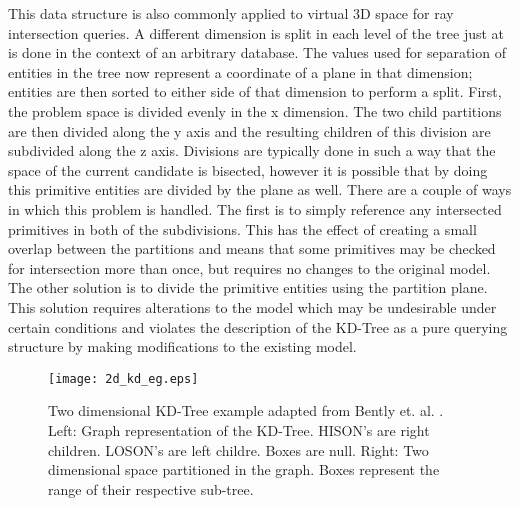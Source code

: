 This data structure is also commonly applied to virtual 3D space for ray
intersection queries. A different dimension is split in each level of the tree
just at is done in the context of an arbitrary database. The values used for
separation of entities in the tree now represent a coordinate of a plane in that
dimension; entities are then sorted to either side of that dimension to perform
a split. First, the problem space is divided evenly in the x dimension. The two
child partitions are then divided along the y axis and the resulting children of
this division are subdivided along the z axis. Divisions are typically done in
such a way that the space of the current candidate is bisected, however it is
possible that by doing this primitive entities are divided by the plane as
well. There are a couple of ways in which this problem is handled. The first is
to simply reference any intersected primitives in both of the subdivisions. This
has the effect of creating a small overlap between the partitions and means that
some primitives may be checked for intersection more than once, but requires no
changes to the original model. The other solution is to divide the primitive
entities using the partition plane.  This solution requires alterations to the
model which may be undesirable under certain conditions and violates the
description of the KD-Tree as a pure querying structure by making modifications
to the existing model.

\begin{figure}[H]

  \texttt{[image: 2d\_kd\_eg.eps]}
  \caption{Two dimensional KD-Tree example adapted from Bently
    et. al. \cite{Bentley_1975}. Left: Graph representation of the
    KD-Tree. HISON's are right children. LOSON's are left childre. Boxes are
    null. Right: Two dimensional space partitioned in the graph. Boxes represent
    the range of their respective sub-tree.}
  \label{fig:2D_kd_tree}
\end{figure}

